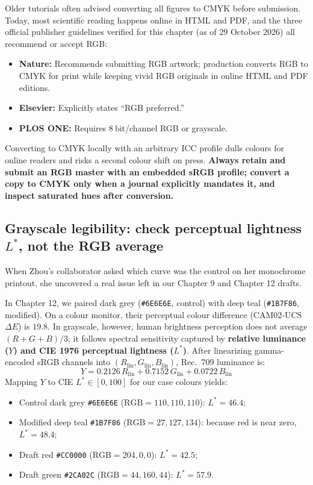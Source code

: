 Older tutorials often advised converting all figures to CMYK before submission. Today, most scientific reading happens online in HTML and PDF, and the three official publisher guidelines verified for this chapter (as of 29 October 2026) all recommend or accept RGB:
\begin{itemize}
\item \textbf{Nature:} Recommends submitting RGB artwork; production converts RGB to CMYK for print while keeping vivid RGB originals in online HTML and PDF editions.
\item \textbf{Elsevier:} Explicitly states ``RGB preferred.''
\item \textbf{PLOS ONE:} Requires $8\ \text{bit}$/channel RGB or grayscale.
\end{itemize}

Converting to CMYK locally with an arbitrary ICC profile dulls colours for online readers and risks a second colour shift on press. \textbf{Always retain and submit an RGB master with an embedded sRGB profile; convert a copy to CMYK only when a journal explicitly mandates it, and inspect saturated hues after conversion.}

\subsection*{Grayscale legibility: check perceptual lightness $L^*$, not the RGB average}

When Zhou's collaborator asked which curve was the control on her monochrome printout, she uncovered a real issue left in our Chapter 9 and Chapter 12 drafts.

In Chapter 12, we paired dark grey (\texttt{\#6E6E6E}, control) with deep teal (\texttt{\#1B7F86}, modified). On a colour monitor, their perceptual colour difference (CAM02-UCS $\Delta E$) is $19.8$. In grayscale, however, human brightness perception does not average $(R + G + B)/3$; it follows spectral sensitivity captured by \textbf{relative luminance ($Y$) and CIE 1976 perceptual lightness ($L^*$)}. After linearizing gamma-encoded sRGB channels into $(R_{\text{lin}}, G_{\text{lin}}, B_{\text{lin}})$, Rec.~709 luminance is:
\[
Y = 0.2126\,R_{\text{lin}} + 0.7152\,G_{\text{lin}} + 0.0722\,B_{\text{lin}}
\]
Mapping $Y$ to CIE $L^* \in [0, 100]$ for our case colours yields:
\begin{itemize}
\item Control dark grey \texttt{\#6E6E6E} ($\text{RGB} = 110, 110, 110$): \textbf{$L^* = 46.4$};
\item Modified deep teal \texttt{\#1B7F86} ($\text{RGB} = 27, 127, 134$): because red is near zero, \textbf{$L^* = 48.4$};
\item Draft red \texttt{\#CC0000} ($\text{RGB} = 204, 0, 0$): $L^* = 42.5$;
\item Draft green \texttt{\#2CA02C} ($\text{RGB} = 44, 160, 44$): $L^* = 57.9$.
\end{itemize}

